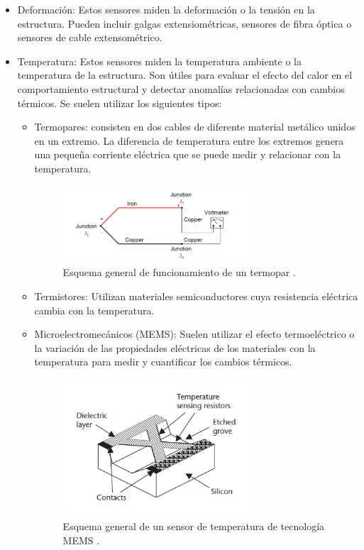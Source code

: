     \begin{itemize}
        \item Deformación: Estos sensores miden la deformación o la tensión en la estructura. Pueden incluir galgas extensiométricas, sensores de fibra óptica o sensores de cable extensométrico.
        \item Temperatura:  Estos sensores miden la temperatura ambiente o la temperatura de la estructura. Son útiles para evaluar el efecto del calor en el comportamiento estructural y detectar anomalías relacionadas con cambios térmicos. Se suelen utilizar los siguientes tipos:
        \begin{itemize}
            \item Termopares: consisten en dos cables de diferente material metálico unidos en un extremo. La diferencia de temperatura entre los extremos genera una pequeña corriente eléctrica que se puede medir y relacionar con la temperatura.
             \begin{figure}[H]
                \centering
                \includegraphics[width = 0.7\textwidth]{imagenes/cap1_marcoteo/termocupla-con-voltimetro.png}
                \caption{Esquema general de funcionamiento de un termopar \citep{dunn2005introduction}.}
                \label{fig:termopar}
            \end{figure}
            \item Termistores: Utilizan materiales semiconductores cuya resistencia eléctrica cambia con la temperatura. 
            \item Microelectromecánicos (MEMS): Suelen utilizar el efecto termoeléctrico o la variación de las propiedades eléctricas de los materiales con la temperatura para medir y cuantificar los cambios térmicos.
            \begin{figure}[H]
                \centering
                \includegraphics[width = 0.7\textwidth]{imagenes/cap1_marcoteo/TempMEMS.png}
                \caption{Esquema general de un sensor de temperatura de tecnología MEMS \citep{dunn2005introduction}.}
                \label{fig:temp-MEMS}
            \end{figure}
        \end{itemize}


\end{itemize}
